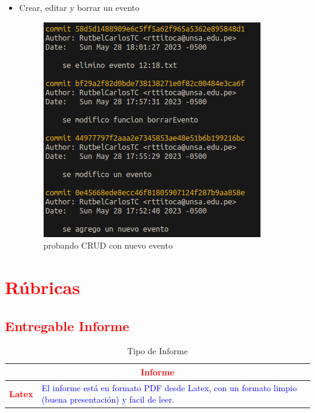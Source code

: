 \documentclass{article}
\begin{document}
\begin{itemize}
    \item Crear, editar y borrar un evento
    \begin{figure}[H]
        \centering
        \includegraphics[scale=0.5]{img/commits/commits-agregar-editar-y borra un evento.png}
        \caption{probando CRUD con nuevo evento}
    \end{figure}
    
\end{itemize}


\section{\textcolor{red}{Rúbricas}}
\subsection{\textcolor{red}{Entregable Informe}}
\begin{table}[H]
	\caption{Tipo de Informe}
	\setlength{\tabcolsep}{0.5em} %
	{\renewcommand{\arraystretch}{1.5}%

		\begin{tabular}{|p{3cm}|p{12cm}|}
			\hline
			\multicolumn{2}{|c|}{\textbf{\textcolor{red}{Informe}}}                                                                                                      \\
			\hline
			\textbf{\textcolor{red}{Latex}} & \textcolor{blue}{El informe está en formato PDF desde Latex,  con un formato limpio (buena presentación) y facil de leer.} \\
			\hline
		\end{tabular}
	}
\end{table}
\end{document}
